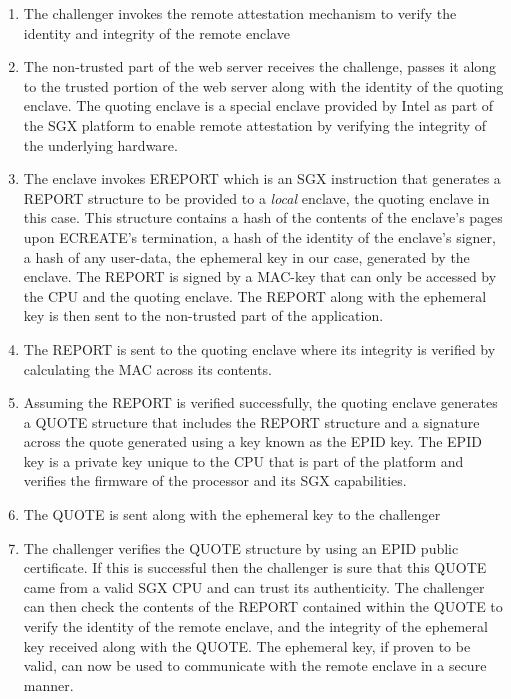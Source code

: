 \documentclass[../main.tex]{subfiles}
\begin{document}
\begin{enumerate}
  \item The challenger invokes the remote attestation mechanism to
    verify the identity and integrity of the remote enclave
  \item The non-trusted part of the web server receives the challenge,
    passes it along to the trusted portion of the web server along with
    the identity of the quoting enclave. The quoting enclave is a
    special enclave provided by Intel as part of the SGX platform to
    enable remote attestation by verifying the integrity of the
    underlying hardware. %
  \item The enclave invokes EREPORT which is an SGX instruction that
    generates a REPORT structure to be provided to a \textit{local}
    enclave, the quoting enclave in this case.  This structure contains
    a hash of the contents of the enclave's pages upon ECREATE's
    termination, a hash of the identity of the enclave's signer, a hash
    of any user-data, the ephemeral key in our case, generated by the
    enclave. The REPORT is signed by a MAC-key that can only be accessed
    by the CPU and the quoting enclave. The REPORT along with the
    ephemeral key is then sent to the non-trusted part of the
    application.
  \item The REPORT is sent to the quoting enclave where its integrity is
    verified by calculating the MAC across its contents.
  \item Assuming the REPORT is verified successfully, the quoting
    enclave generates a QUOTE structure that includes the REPORT
    structure and a signature across the quote generated using a key
    known as the EPID key. %
    The EPID key is a private key unique to the CPU that is part of the
    platform and verifies the firmware of the processor and its SGX
    capabilities.
  \item The QUOTE is sent along with the ephemeral key to the challenger
  \item The challenger verifies the QUOTE structure by using an EPID
    public certificate. If this is successful then the challenger is
    sure that this QUOTE came from a valid SGX CPU and can trust its
    authenticity. The challenger can then check the contents of the
    REPORT contained within the QUOTE to verify the identity of the
    remote enclave, and the integrity of the ephemeral key received
    along with the QUOTE. The ephemeral key, if proven to be valid, can
    now be used to communicate with the remote enclave in a secure
    manner.
\end{enumerate}
		
\end{document}

